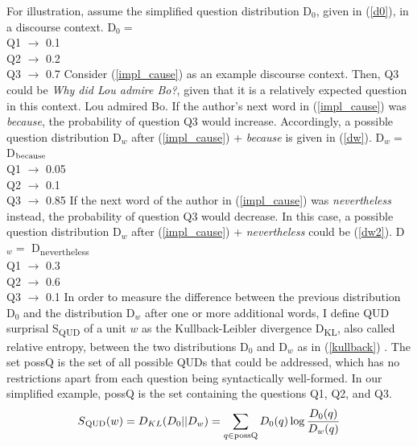 \documentclass[output=paper,colorlinks,citecolor=brown]{langscibook}
\begin{document}
For illustration, assume the simplified question distribution D$_{0}$, given in (\ref{d0}), in a discourse context.
\ea\label{d0}D$_{0}=$\\
Q1 $\rightarrow$ 0.1\\
Q2 $\rightarrow$ 0.2\\
Q3 $\rightarrow$ 0.7%
\z
%
 Consider (\ref{impl_cause}) as an example discourse context. Then, Q3 could be \textit{Why did Lou admire Bo?}, given that it is a relatively expected question in this context.
\ea\label{impl_cause}Lou admired Bo.
\z
If the author's next word in (\ref{impl_cause}) was \textit{because}, the probability of question Q3 would increase. Accordingly, a possible question distribution D$_{w}$ after (\ref{impl_cause}) + \textit{because} is given in (\ref{dw}).
\ea\label{dw}D$_{w}=$ D$\textsubscript{because}$\\
Q1 $\rightarrow$ 0.05\\
Q2 $\rightarrow$ 0.1\\
Q3 $\rightarrow$ 0.85%
\z
%
If the next word of the author in (\ref{impl_cause}) was \textit{nevertheless} instead, the probability of question Q3 would decrease. In this case, a possible question distribution D$_{w}$ after (\ref{impl_cause}) + \textit{nevertheless} could be (\ref{dw2}).
\ea\label{dw2}D$_{w}=$ D\textsubscript{nevertheless}\\
Q1 $\rightarrow$ 0.3\\
Q2 $\rightarrow$ 0.6\\
Q3 $\rightarrow$ 0.1%
\z
%
In order to measure the difference between the previous distribution D$_{0}$ and the distribution D$_{w}$ after one or more additional words, I define QUD surprisal S\textsubscript{QUD} of a unit $w$ as the Kullback-Leibler divergence D\textsubscript{KL}, also called relative entropy, between the two distributions D$_{0}$ and D$_{w}$ as in (\ref{kullback}) \citep[following][195]{demberg_keller_2008}. The set possQ is the set of all possible QUDs that could be addressed, which has no restrictions apart from each question being syntactically well-formed. In our simplified example, possQ is the set containing the questions Q1, Q2, and Q3.
\begin{equation}
    S\textsubscript{\text{QUD}}(w) = D_{KL}(D_{0}||D_{w})=\sum_{q \in \text{possQ}}D_{0}(q)\log\frac{D_{0}(q)}{D_{w}(q)}\label{kullback} 
\end{equation}
\end{document}
